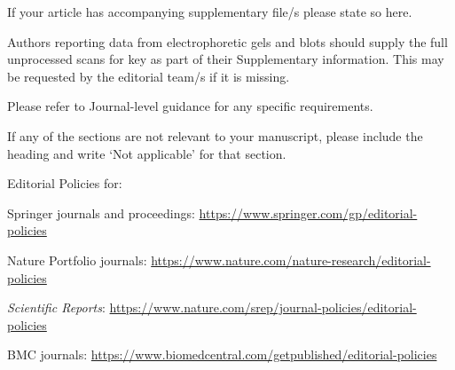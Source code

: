 \documentclass[pdflatex,sn-mathphys-num]{sn-jnl}%
\theoremstyle{thmstyleone}%
\theoremstyle{thmstyletwo}%
\theoremstyle{thmstylethree}%
\begin{document}
\backmatter


If your article has accompanying supplementary file/s please state so here. 

Authors reporting data from electrophoretic gels and blots should supply the full unprocessed scans for key as part of their Supplementary information. This may be requested by the editorial team/s if it is missing.

Please refer to Journal-level guidance for any specific requirements.


\noindent
If any of the sections are not relevant to your manuscript, please include the heading and write `Not applicable' for that section. 

\bigskip
\begin{flushleft}%
Editorial Policies for:

\bigskip\noindent
Springer journals and proceedings: \url{https://www.springer.com/gp/editorial-policies}

\bigskip\noindent
Nature Portfolio journals: \url{https://www.nature.com/nature-research/editorial-policies}

\bigskip\noindent
\textit{Scientific Reports}: \url{https://www.nature.com/srep/journal-policies/editorial-policies}

\bigskip\noindent
BMC journals: \url{https://www.biomedcentral.com/getpublished/editorial-policies}
\end{flushleft}
\end{document}
